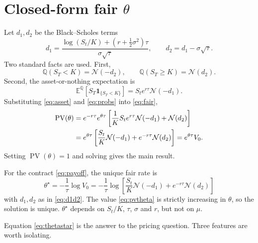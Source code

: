\documentclass[11pt]{article}
\newcommand{\N}{\mathcal{N}}
\newcommand{\E}{\mathbb{E}}
\newcommand{\Q}{\mathbb{Q}}
\newcommand{\PV}{\operatorname{PV}}
\newcommand{\ind}[1]{\mathbf{1}_{\{#1\}}}
\begin{document}
\section{Closed-form fair \texorpdfstring{$\theta$}{theta}}

Let $d_1,d_2$ be the Black--Scholes terms
\begin{equation}\label{eq:d1d2}
d_1=\frac{\log(S_t/K)+(r+\tfrac12\sigma^2)\tau}{\sigma\sqrt{\tau}},
\qquad
d_2=d_1-\sigma\sqrt{\tau}.
\end{equation}
Two standard facts are used. First,
\begin{equation}\label{eq:probs}
\Q(S_T<K)=\N(-d_2),\qquad \Q(S_T\ge K)=\N(d_2).
\end{equation}
Second, the asset-or-nothing expectation is
\begin{equation}\label{eq:asset}
\E^{\Q}\!\left[S_T\ind{S_T<K}\right]=S_t e^{r\tau}\N(-d_1).
\end{equation}
Substituting \eqref{eq:asset} and \eqref{eq:probs} into \eqref{eq:fair},
\begin{align}
\PV(\theta)
&=e^{-r\tau}e^{\theta\tau}\left[\frac{1}{K}S_t e^{r\tau}\N(-d_1)+\N(d_2)\right] \notag\\
&=e^{\theta\tau}\left[\frac{S_t}{K}\N(-d_1)+e^{-r\tau}\N(d_2)\right]
=e^{\theta\tau}V_0.
\label{eq:pvtheta}
\end{align}
Setting $\PV(\theta)=1$ and solving gives the main result.

\begin{tcolorbox}[colback=inkblue!4,colframe=inkblue!60,title=\textbf{Proposition 1 (fair \texorpdfstring{$\theta$}{theta})}]
For the contract \eqref{eq:payoff}, the unique fair rate is
\begin{equation}\label{eq:thetastar}
\boxed{\;\theta^\star=-\frac{1}{\tau}\log V_0
=-\frac{1}{\tau}\log\left[\frac{S_t}{K}\N(-d_1)+e^{-r\tau}\N(d_2)\right]\;}
\end{equation}
with $d_1,d_2$ as in \eqref{eq:d1d2}. The value \eqref{eq:pvtheta} is strictly increasing in $\theta$, so the solution is unique. $\theta^\star$ depends on $S_t/K$, $\tau$, $\sigma$ and $r$, but not on $\mu$.
\end{tcolorbox}

\noindent
Equation \eqref{eq:thetastar} is the answer to the pricing question. Three features are worth isolating.
\end{document}
